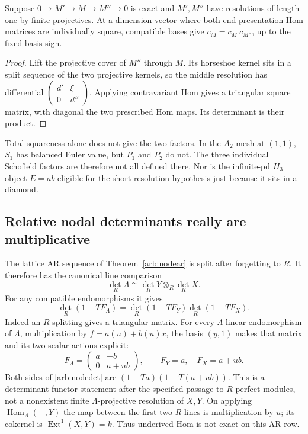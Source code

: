 \begin{proposition}
Suppose $0\to M'\to M\to M''\to0$ is exact and $M',M''$ have resolutions
of length one by finite projectives. At a dimension vector where both end
presentation Hom matrices are individually square, compatible bases give
$c_M=c_{M'}c_{M''}$, up to the fixed basis sign.
\end{proposition}
\begin{proof}
Lift the projective cover of $M''$ through $M$. Its horseshoe kernel sits in
a split sequence of the two projective kernels, so the middle resolution
has differential $\left(\begin{smallmatrix}d'&\xi\\0&d''\end{smallmatrix}\right)$.
Applying contravariant Hom gives a triangular square matrix, with diagonal
the two prescribed Hom maps. Its determinant is their product.
\end{proof}
Total squareness alone does not give the two factors. In the $A_2$ mesh at
$(1,1)$, $S_1$ has balanced Euler value, but $P_1$ and $P_2$ do not. The
three individual Schofield factors are therefore not all defined there.
Nor is the infinite-pd $H_3$ object $E=ab$ eligible for the short-resolution
hypothesis just because it sits in a diamond.

\subsection{Relative nodal determinants really are multiplicative}
The lattice AR sequence of Theorem~\ref{arb:nodear} is split after forgetting
to $R$. It therefore has the canonical line comparison
\[
 \det_R\Lambda\cong\det_R Y\otimes_R\det_R X.
\]
For any compatible endomorphisms it gives
\begin{equation}\label{arb:nodedet}
 \det_R(1-TF_\Lambda)=\det_R(1-TF_Y)\det_R(1-TF_X).
\end{equation}
Indeed an $R$-splitting gives a triangular matrix. For every $\Lambda$-linear
endomorphism of $\Lambda$, multiplication by $f=a(u)+b(u)x$, the basis
$(y,1)$ makes that matrix and its two scalar actions explicit:
\[
 F_\Lambda=\begin{pmatrix}a&-b\\0&a+ub\end{pmatrix},
 \qquad F_Y=a,\quad F_X=a+ub.
\]
Both sides of \eqref{arb:nodedet} are $(1-Ta)(1-T(a+ub))$.
This is a determinant-functor statement after the specified passage to
$R$-perfect modules, not a nonexistent finite $\Lambda$-projective resolution
of $X,Y$. On applying $\operatorname{Hom}_\Lambda(-,Y)$ the map between
the first two $R$-lines is multiplication by $u$; its cokernel is
$\operatorname{Ext}^1(X,Y)=k$. Thus underived Hom is not exact on this AR row.

